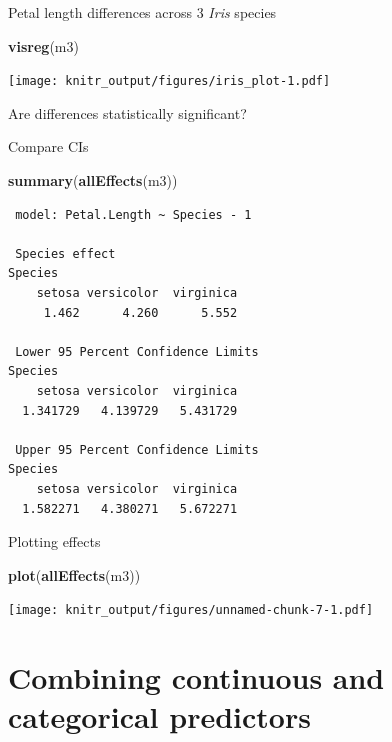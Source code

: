 \documentclass[10pt,ignorenonframetext,]{beamer}
\newenvironment{Shaded}{\begin{snugshade}}{\end{snugshade}}
\newcommand{\KeywordTok}[1]{\textcolor[rgb]{0.13,0.29,0.53}{\textbf{{#1}}}}
\newcommand{\NormalTok}[1]{{#1}}
\begin{document}
\begin{frame}[fragile]{Petal length differences across 3 \emph{Iris}
species}

\begin{Shaded}
\begin{Highlighting}[]
\KeywordTok{visreg}\NormalTok{(m3)}
\end{Highlighting}
\end{Shaded}

\texttt{[image: knitr\_output/figures/iris\_plot-1.pdf]}

\end{frame}

\begin{frame}[fragile]{Are differences statistically significant?}

Compare CIs

\begin{Shaded}
\begin{Highlighting}[]
\KeywordTok{summary}\NormalTok{(}\KeywordTok{allEffects}\NormalTok{(m3))}
\end{Highlighting}
\end{Shaded}

\begin{verbatim}
 model: Petal.Length ~ Species - 1

 Species effect
Species
    setosa versicolor  virginica 
     1.462      4.260      5.552 

 Lower 95 Percent Confidence Limits
Species
    setosa versicolor  virginica 
  1.341729   4.139729   5.431729 

 Upper 95 Percent Confidence Limits
Species
    setosa versicolor  virginica 
  1.582271   4.380271   5.672271 
\end{verbatim}

\end{frame}

\begin{frame}[fragile]{Plotting effects}

\begin{Shaded}
\begin{Highlighting}[]
\KeywordTok{plot}\NormalTok{(}\KeywordTok{allEffects}\NormalTok{(m3))}
\end{Highlighting}
\end{Shaded}

\texttt{[image: knitr\_output/figures/unnamed-chunk-7-1.pdf]}

\end{frame}

\section{Combining continuous and categorical
predictors}\label{combining-continuous-and-categorical-predictors}
\end{document}
